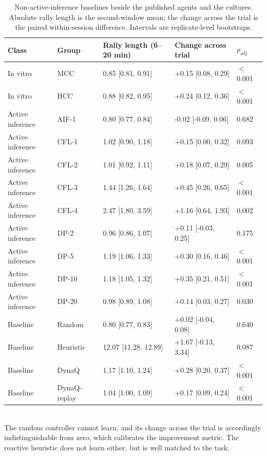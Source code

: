 \begin{table}[ht]
\centering
\small
\caption{Non-active-inference baselines beside the published agents and the cultures. Absolute rally length is the second-window mean; the change across the trial is the paired within-session difference. Intervals are replicate-level bootstraps.}
\label{tab:baselines}
\begin{tabular}{lllll}
\toprule
Class & Group & Rally length (6--20 min) & Change across trial & $p_{\mathrm{adj}}$ \\
\midrule
In vitro & MCC & 0.85 [0.81, 0.91] & +0.15 [0.08, 0.29] & $<$0.001 \\
In vitro & HCC & 0.88 [0.82, 0.95] & +0.24 [0.12, 0.36] & $<$0.001 \\
Active inference & AIF-1 & 0.80 [0.77, 0.84] & -0.02 [-0.09, 0.06] & 0.682 \\
Active inference & CFL-1 & 1.02 [0.90, 1.18] & +0.15 [0.00, 0.32] & 0.093 \\
Active inference & CFL-2 & 1.01 [0.92, 1.11] & +0.18 [0.07, 0.29] & 0.005 \\
Active inference & CFL-3 & 1.44 [1.26, 1.64] & +0.45 [0.26, 0.65] & $<$0.001 \\
Active inference & CFL-4 & 2.47 [1.80, 3.59] & +1.16 [0.64, 1.93] & 0.002 \\
Active inference & DP-2 & 0.96 [0.86, 1.07] & +0.11 [-0.03, 0.25] & 0.175 \\
Active inference & DP-5 & 1.19 [1.06, 1.33] & +0.30 [0.16, 0.46] & $<$0.001 \\
Active inference & DP-10 & 1.18 [1.05, 1.32] & +0.35 [0.21, 0.51] & $<$0.001 \\
Active inference & DP-20 & 0.98 [0.89, 1.08] & +0.14 [0.03, 0.27] & 0.030 \\
Baseline & Random & 0.80 [0.77, 0.83] & +0.02 [-0.04, 0.08] & 0.640 \\
Baseline & Heuristic & 12.07 [11.28, 12.89] & +1.67 [-0.13, 3.34] & 0.087 \\
Baseline & DynaQ & 1.17 [1.10, 1.24] & +0.28 [0.20, 0.37] & $<$0.001 \\
Baseline & DynaQ-replay & 1.04 [1.00, 1.09] & +0.17 [0.09, 0.24] & $<$0.001 \\
\bottomrule
\end{tabular}
\\[4pt]\footnotesize{The random controller cannot learn, and its change across the trial is accordingly indistinguishable from zero, which calibrates the improvement metric. The reactive heuristic does not learn either, but is well matched to the task.}
\end{table}
